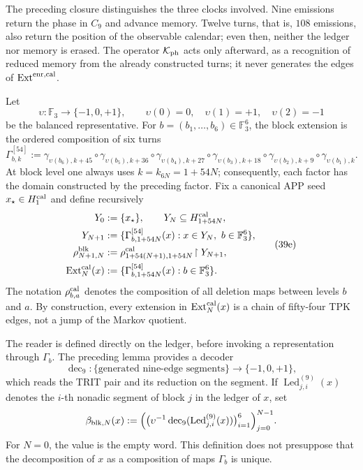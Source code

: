 The preceding closure distinguishes the three clocks involved. Nine emissions
return the phase in \(C_9\) and advance memory. Twelve turns, that is,
\(108\) emissions, also return the position of the observable calendar; even
then, neither the ledger nor memory is erased. The operator
\(\mathcal K_{\rm ph}\) acts only afterward, as a recognition of reduced
memory from the already constructed turns; it never generates the edges of
\(\operatorname{Ext}^{\rm enr,cal}\).



Let
\[
 \upsilon:\mathbb F_3\longrightarrow\{-1,0,+1\},\qquad
 \upsilon(0)=0,\quad\upsilon(1)=+1,\quad\upsilon(2)=-1
\]
be the balanced representative. For
\(b=(b_1,\ldots,b_6)\in\mathbb F_3^6\), the block extension is the
ordered composition of six turns
\[
 \Gamma_{b,k}^{[54]}:=
 \gamma_{\upsilon(b_6),k+45}\circ\gamma_{\upsilon(b_5),k+36}\circ
 \gamma_{\upsilon(b_4),k+27}\circ\gamma_{\upsilon(b_3),k+18}\circ
 \gamma_{\upsilon(b_2),k+9}\circ\gamma_{\upsilon(b_1),k}.
\tag{39d}
\label{ix:eq:gamma-bloque-54-ch}
\]
At block level one always uses
\(k=k_{6N}=1+54N\); consequently, each factor has the domain constructed by
the preceding factor.
Fix a canonical APP seed \(x_\star\in H^{\rm cal}_1\) and define recursively
\[
 \begin{aligned}
  Y_0&:=\{x_\star\},\qquad Y_N\subseteq H_{1+54N}^{\rm cal},\\
  Y_{N+1}&:=\{\Gamma_{b,1+54N}^{[54]}(x):
                 x\in Y_N,\ b\in\mathbb F_3^6\},\\
  \rho^{\rm blk}_{N+1,N}
    &:=\rho^{\rm cal}_{1+54(N+1),1+54N}
       \!\upharpoonright Y_{N+1},\\
  \operatorname{Ext}^{\rm cal}_N(x)
    &:=\{\Gamma_{b,1+54N}^{[54]}(x):b\in\mathbb F_3^6\}.
 \end{aligned}
\tag{39e}
\label{ix:eq:sincronizacion-54-ch}
\]
The notation \(\rho^{\rm cal}_{b,a}\) denotes the composition of all deletion maps
between levels \(b\) and \(a\). By construction, every extension in
\(\operatorname{Ext}^{\rm cal}_N(x)\) is a chain of fifty-four
TPK edges, not a jump of the Markov quotient.

The reader is defined directly on the ledger, before invoking a
representation through \(\Gamma_b\). The preceding lemma provides a
decoder
\[
 \operatorname{dec}_9:\{\text{generated nine-edge segments}\}
 \longrightarrow\{-1,0,+1\},
\]
which reads the TRIT pair and its reduction on the segment. If
\(\operatorname{Led}^{(9)}_{j,i}(x)\) denotes the \(i\)-th nonadic segment
of block \(j\) in the ledger of \(x\), set
\begin{equation}
 \beta_{{\rm blk},N}(x):=
 \Bigl(
   \bigl(\upsilon^{-1}\operatorname{dec}_9
          (\operatorname{Led}^{(9)}_{j,i}(x))\bigr)_{i=1}^{6}
 \Bigr)_{j=0}^{N-1}.
 \label{ix:eq:lector-bloques-ch}
\end{equation}
For \(N=0\), the value is the empty word. This definition does not presuppose
that the decomposition of \(x\) as a composition of maps \(\Gamma_b\) is
unique.

